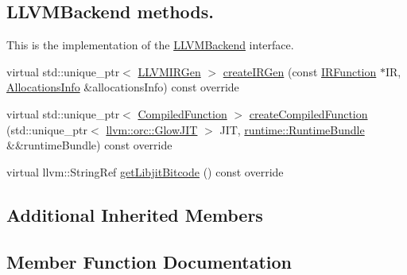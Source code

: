 \subsection*{L\+L\+V\+M\+Backend methods.}
\label{_amgrpd318766a8ca4e10c8a1d4679fc590a89}%
 This is the implementation of the \hyperlink{classglow_1_1_l_l_v_m_backend}{L\+L\+V\+M\+Backend} interface. \begin{DoxyCompactItemize}
\item 
virtual std\+::unique\+\_\+ptr$<$ \hyperlink{classglow_1_1_l_l_v_m_i_r_gen}{L\+L\+V\+M\+I\+R\+Gen} $>$ \hyperlink{classglow_1_1_c_p_u_backend_a09cf2b220300c5cd9234e6476d3ab3df}{create\+I\+R\+Gen} (const \hyperlink{classglow_1_1_i_r_function}{I\+R\+Function} $\ast$IR, \hyperlink{structglow_1_1_allocations_info}{Allocations\+Info} \&allocations\+Info) const override
\item 
virtual std\+::unique\+\_\+ptr$<$ \hyperlink{classglow_1_1_compiled_function}{Compiled\+Function} $>$ \hyperlink{classglow_1_1_c_p_u_backend_ad7092a724021d60563985209df1a8f64}{create\+Compiled\+Function} (std\+::unique\+\_\+ptr$<$ \hyperlink{classllvm_1_1orc_1_1_glow_j_i_t}{llvm\+::orc\+::\+Glow\+J\+IT} $>$ J\+IT, \hyperlink{classglow_1_1runtime_1_1_runtime_bundle}{runtime\+::\+Runtime\+Bundle} \&\&runtime\+Bundle) const override
\item 
virtual llvm\+::\+String\+Ref \hyperlink{classglow_1_1_c_p_u_backend_a7fc1ad88ad6abc11274fdbfd515e981d}{get\+Libjit\+Bitcode} () const override
\end{DoxyCompactItemize}
\subsection*{Additional Inherited Members}


\subsection{Member Function Documentation}
\mbox{\label{classglow_1_1_c_p_u_backend_ad7092a724021d60563985209df1a8f64}} 
